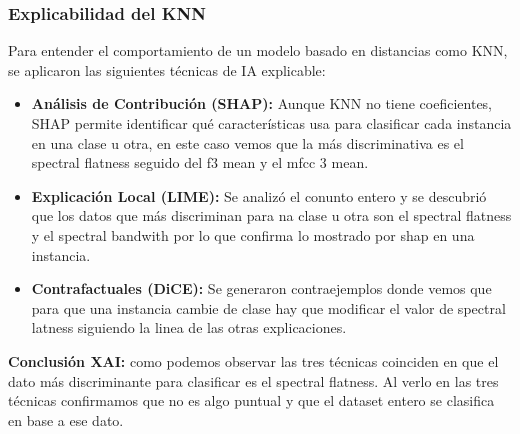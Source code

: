 \subsubsection*{Explicabilidad del KNN}

Para entender el comportamiento de un modelo basado en distancias como KNN, se aplicaron las siguientes técnicas de IA explicable:

\begin{itemize}
    \item \textbf{Análisis de Contribución (SHAP):} Aunque KNN no tiene coeficientes, SHAP permite identificar qué características usa para clasificar cada instancia en una clase u otra, en este caso vemos que la más discriminativa es el spectral flatness seguido del f3 mean y el mfcc 3 mean.
    \item \textbf{Explicación Local (LIME):} Se analizó el conunto entero y se descubrió que los datos que más discriminan para na clase u otra son el spectral flatness y el spectral bandwith por lo que confirma lo mostrado por shap en una instancia.
    \item \textbf{Contrafactuales (DiCE):} Se generaron contraejemplos donde vemos que para que una instancia cambie de clase hay que modificar el valor de spectral latness siguiendo la linea de las otras explicaciones.
\end{itemize}

\textbf{Conclusión XAI:} como podemos observar las tres técnicas coinciden en que el dato más discriminante para clasificar es el spectral flatness. Al verlo en las tres técnicas confirmamos que no es algo puntual y que el dataset entero se clasifica en base a ese dato.
